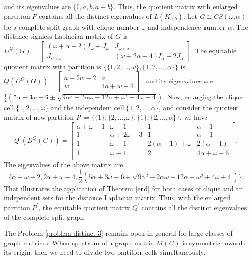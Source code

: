 \documentclass[12pt,twoside]{article}
\begin{document}
and its eigenvalues are $\{0,a,b,a+b\}.$ Thus, the quotient matrix with enlarged partition $P $ contains all the distinct eigenvalues of $ L(K_{a,b}).$ Let $G\cong CS(\omega,\alpha)$ be a complete split graph with clique number $\omega$ and independence number $\alpha$. The distance signless Laplacian matrix of $ G$ is $D^{Q}(G)=\begin{bmatrix} (\omega+\alpha-2)I_{\omega}+J_{\omega}& J_{\omega\times \alpha}\\ J_{\alpha\times \omega} & (\omega+2\alpha-4)I_{\alpha}+2J_{\alpha}
\end{bmatrix}.$ The equitable quotient matrix with partition is $\{\{1,2,\dots,\omega\},\{1,2,\dots,\alpha\}\}$ is $Q(D^{Q}(G))=\left[ \begin{array}{cc}
a+2 w-2 & a \\
w & 4 a+w-4 
\end{array}
\right],$ and its eigenvalues are $\frac{1}{2} \left(5 \alpha+3 \omega-6\pm \sqrt{9 \alpha^2-2 \alpha \omega-12 \alpha+\omega^2+4 \omega+4}\right)$. Now, enlarging the clique cell $\{1,2,\dots,\omega\}$ and the independent cell $\{1,2,\dots,\alpha\}$, and consider the quotient matrix of new partition $P^{\prime}=\{\{1\},\{2,\dots,\omega\},\{1\},\{2,\dots,\alpha\}\}$, we have
$$ Q^{\prime}(D^{Q}(G))=\left[
\begin{array}{cccc}
	\alpha+\omega-1 & \omega-1 & 1 & \alpha-1 \\
	1 & \alpha+2 \omega-3 & 1 & \alpha-1 \\
	1 & \omega-1 & 2 (\alpha-1)+\omega & 2 (\alpha-1) \\
	1 & \omega-1 & 2 & 4 \alpha+\omega-6 \\
\end{array}
\right].$$
The eigenvalues of the above matrix are 
$$ \Big\{\alpha + \omega-2, 2 \alpha + \omega-4,  \frac{1}{2} \left(5 \alpha+3 \omega-6\pm \sqrt{9 \alpha^2-2 \alpha \omega-12 \alpha+\omega^2+4 \omega+4}\right)\Big\}. $$
That illustrates the application of Theorem \ref{end} for both cases of clique and an independent sets for the distance Laplacian matrix. Thus, with the enlarged partition $P^{\prime}$, the equitable quotient matrix $Q^{\prime}$ contains all the distinct eigenvalues of the complete split graph.

The Problem \ref{problem distinct 3} remains open in general for large classes of graph matrices. When spectrum of a graph matrix $M(G)$ is symmetric towards its origin, then we need to divide two partition cells simultaneously. 
\end{document}
